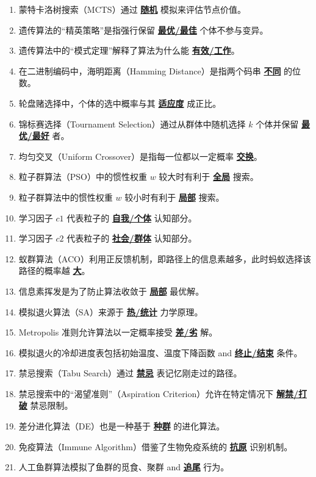 \documentclass[12pt,a4paper,openany]{ctexbook}
\begin{document}
\begin{enumerate}[resume,leftmargin=2em,itemsep=1pt]
\item 蒙特卡洛树搜索（MCTS）通过 \underline{\textbf{随机}} 模拟来评估节点价值。
\item 遗传算法的“精英策略”是指强行保留 \underline{\textbf{最优/最佳}} 个体不参与变异。
\item 遗传算法中的“模式定理”解释了算法为什么能 \underline{\textbf{有效/工作}}。
\item 在二进制编码中，海明距离（Hamming Distance）是指两个码串 \underline{\textbf{不同}} 的位数。
\item 轮盘赌选择中，个体的选中概率与其 \underline{\textbf{适应度}} 成正比。
\item 锦标赛选择（Tournament Selection）通过从群体中随机选择 $k$ 个体并保留 \underline{\textbf{最优/最好}} 者。
\item 均匀交叉（Uniform Crossover）是指每一位都以一定概率 \underline{\textbf{交换}}。
\item 粒子群算法（PSO）中的惯性权重 $w$ 较大时有利于 \underline{\textbf{全局}} 搜索。
\item 粒子群算法中的惯性权重 $w$ 较小时有利于 \underline{\textbf{局部}} 搜索。
\item 学习因子 $c1$ 代表粒子的 \underline{\textbf{自我/个体}} 认知部分。
\item 学习因子 $c2$ 代表粒子的 \underline{\textbf{社会/群体}} 认知部分。
\item 蚁群算法（ACO）利用正反馈机制，即路径上的信息素越多，此时蚂蚁选择该路径的概率越 \underline{\textbf{大}}。
\item 信息素挥发是为了防止算法收敛于 \underline{\textbf{局部}} 最优解。
\item 模拟退火算法（SA）来源于 \underline{\textbf{热/统计}} 力学原理。
\item Metropolis 准则允许算法以一定概率接受 \underline{\textbf{差/劣}} 解。
\item 模拟退火的冷却进度表包括初始温度、温度下降函数 and \underline{\textbf{终止/结束}} 条件。
\item 禁忌搜索（Tabu Search）通过 \underline{\textbf{禁忌}} 表记忆刚走过的路径。
\item 禁忌搜索中的“渴望准则”（Aspiration Criterion）允许在特定情况下 \underline{\textbf{解禁/打破}} 禁忌限制。
\item 差分进化算法（DE）也是一种基于 \underline{\textbf{种群}} 的进化算法。
\item 免疫算法（Immune Algorithm）借鉴了生物免疫系统的 \underline{\textbf{抗原}} 识别机制。
\item 人工鱼群算法模拟了鱼群的觅食、聚群 and \underline{\textbf{追尾}} 行为。

\end{enumerate}
\end{document}
